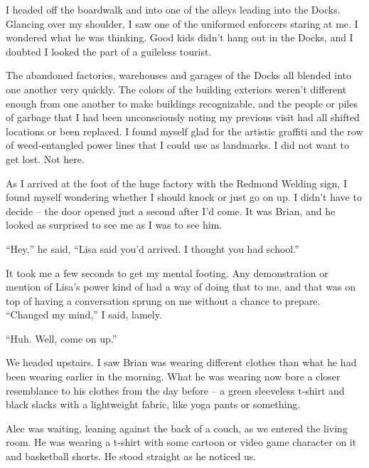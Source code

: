 I headed off the boardwalk and into one of the alleys leading into the Docks.  Glancing over my shoulder, I saw one of the uniformed enforcers staring at me.  I wondered what he was thinking.  Good kids didn't hang out in the Docks, and I doubted I looked the part of a guileless tourist.



The abandoned factories, warehouses and garages of the Docks all blended into one another very quickly.  The colors of the building exteriors weren't different enough from one another to make buildings recognizable, and the people or piles of garbage that I had been unconsciously noting my previous visit had all shifted locations or been replaced.  I found myself glad for the artistic graffiti and the row of weed-entangled power lines that I could use as landmarks.  I did not want to get lost.  Not here.



As I arrived at the foot of the huge factory with the Redmond Welding sign, I found myself wondering whether I should knock or just go on up.  I didn't have to decide – the door opened just a second after I'd come.  It was Brian, and he looked as surprised to see me as I was to see him.



``Hey,'' he said, ``Lisa said you'd arrived.  I thought you had school.''



It took me a few seconds to get my mental footing.  Any demonstration or mention of Lisa's power kind of had a way of doing that to me, and that was on top of having a conversation sprung on me without a chance to prepare.  ``Changed my mind,'' I said, lamely.



``Huh.  Well, come on up.''



We headed upstairs.  I saw Brian was wearing different clothes than what he had been wearing earlier in the morning.  What he was wearing now bore a closer resemblance to his clothes from the day before – a green sleeveless t-shirt and black slacks with a lightweight fabric, like yoga pants or something.



Alec was waiting, leaning against the back of a couch, as we entered the living room.  He was wearing a t-shirt with some cartoon or video game character on it and basketball shorts.  He stood straight as he noticed us.



